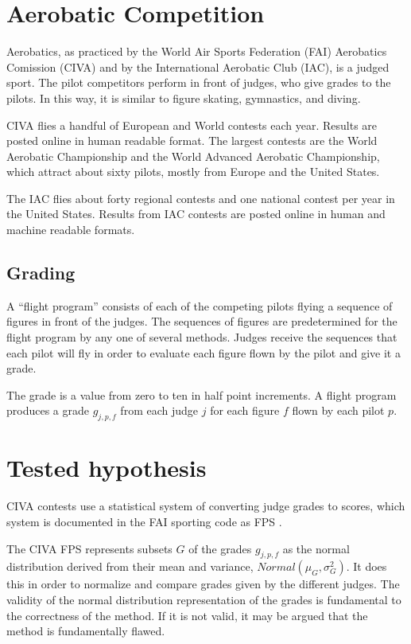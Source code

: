 \section{Aerobatic Competition}

Aerobatics, as practiced by the World Air Sports Federation (FAI)
Aerobatics Comission (CIVA) and by the International Aerobatic Club (IAC),
is a judged sport. The pilot competitors perform in front of judges, who
give grades to the pilots. In this way, it is similar to figure skating,
gymnastics, and diving.

CIVA flies a handful of European and World contests each year.
Results are posted online \cite{civa-results} in human readable format.
The largest contests are the World Aerobatic Championship \cite{wac}
and the World Advanced Aerobatic Championship, which attract about sixty
pilots, mostly from Europe and the United States.

The IAC flies about forty regional contests and one national contest
per year in the United States.
Results from IAC contests are posted online \cite{iaccdb}
in human and machine readable formats.

\subsection{Grading}

A ``flight program'' consists of each of the competing pilots flying a sequence
of figures in front of the judges. The sequences of figures are predetermined
for the flight program by any one of several methods.
Judges receive the sequences that each pilot will fly in order to evaluate
each figure flown by the pilot and give it a grade.

The grade is a value from zero to ten in half point increments.
A flight program produces a grade $g_{j,p,f}$
from each judge $j$ for each figure $f$ flown by each pilot $p$.

\section{Tested hypothesis}

CIVA contests use a statistical system of converting judge grades to scores,
which system is documented in the FAI sporting code as FPS \cite{fps}.

The CIVA FPS represents subsets $G$ of the grades $g_{j,p,f}$
as the normal distribution derived from their mean and variance,
$Normal(\mu_G, \sigma^2_G)$.
It does this in order to normalize and
compare grades given by the different judges.
The validity of the normal distribution
representation of the grades is fundamental to the correctness of the
method.  If it is not valid, it may be argued that the method is fundamentally
flawed.


